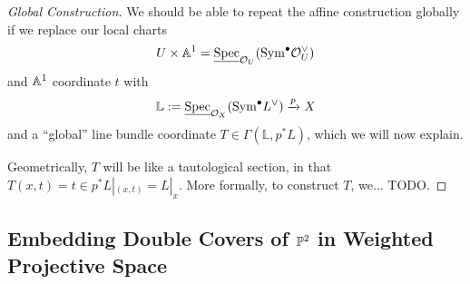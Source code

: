 \documentclass[12pt]{article}
\newcommand{\bL}{\mathbb{L}}
\newcommand{\rSpec}{\underline{\operatorname{Spec}}}
\begin{document}
\begin{proof}[Global Construction]
    We should be able to repeat the affine construction globally if we replace our local charts
    \[U \times \A^1 = \rSpec_{\cO_U}(\Sym^\bullet \cO_U^\vee)\]
    and $\A^1$ coordinate $t$ with
    \[\bL \defeq \rSpec_{\cO_X}(\Sym^\bullet L^\vee) \xrightarrow{p} X\]
    and a ``global'' line bundle coordinate $T\in \Gamma(\mathbb{L},p^*L)$, which we will now explain.

    Geometrically, $T$ will be like a tautological section, in that $T(x,t) = t \in p^* L|_{(x,t)} = L|_x$. More formally, to construct $T$, we... {\color{red} TODO}. 
\end{proof}

\subsection{Embedding Double Covers of \texorpdfstring{$\P^2$}{the Projective Plane} in Weighted Projective Space}


\printbibliography
\end{document}
